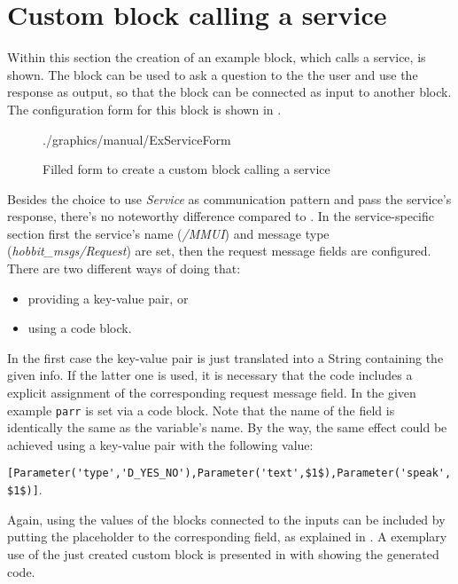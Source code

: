 \section*{Custom block calling a service}
Within this section the creation of an example block, which calls a service, is shown. The block can be used to ask a question to the the user and use the response as output, so that the block can be connected as input to another block. The configuration form for this block is shown in .

\begin{figure}[ht]
	\centering
	\begin{overpic}[width=\linewidth]{./graphics/manual/ExServiceForm}
	\end{overpic}
	\caption{Filled form to create a custom block calling a service}%
	\label{fig:ExServiceForm}%
\end{figure}

Besides the choice to use \textit{Service} as communication pattern and pass the service's response, there's no noteworthy difference compared to . In the service-specific section first the service's name (\textit{/MMUI}) and message type (\textit{hobbit\_msgs/Request}) are set, then the request message fields are configured. There are two different ways of doing that:

\begin{itemize}
	\item providing a key-value pair, or
	\item using a code block.
\end{itemize}

In the first case the key-value pair is just translated into a String containing the given info. If the latter one is used, it is necessary that the code includes a explicit assignment of the corresponding request message field. In the given example \lstinline!parr! is set via a code block. Note that the name of the field is identically the same as the variable's name. By the way, the same effect could be achieved using a key-value pair with the following value: 

\lstinline![Parameter('type','D_YES_NO'),Parameter('text',$1$),Parameter('speak',$1$)]!.

Again, using the values of the blocks connected to the inputs can be included by putting the placeholder to the corresponding field, as explained in . A exemplary use of the just created custom block is presented in  with  showing the generated code.

